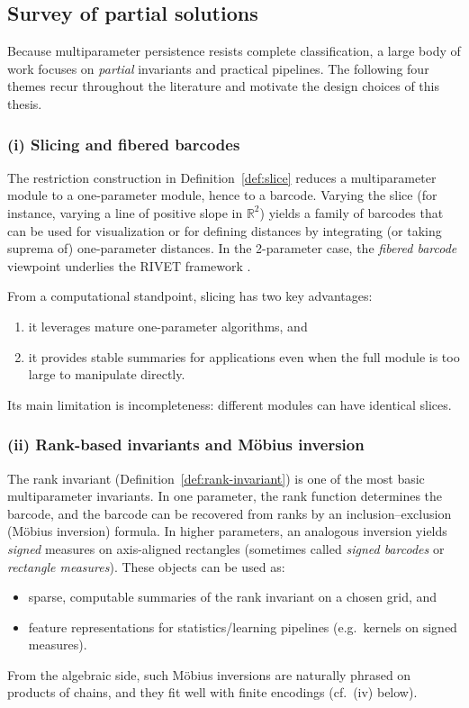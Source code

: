 \documentclass{article}
\newcommand{\<}{\langle}
\renewcommand{\>}{\rangle}
\newcommand{\bbb}[1]{\ensuremath{\mathbb{#1}}}
\theoremstyle{definition}
\theoremstyle{remark}
\begin{document}
	\subsection{Survey of partial solutions}
	\label{sec:background:partial-solutions}
	
	Because multiparameter persistence resists complete classification, a large body of
	work focuses on \emph{partial} invariants and practical pipelines.  The following
	four themes recur throughout the literature and motivate the design choices of this
	thesis.
	
	\subsubsection*{(i) Slicing and fibered barcodes}
	
	The restriction construction in Definition~\ref{def:slice} reduces a multiparameter
	module to a one-parameter module, hence to a barcode.  Varying the slice (for
	instance, varying a line of positive slope in $\bbb{R}^2$) yields a family of barcodes
	that can be used for visualization or for defining distances by integrating (or
	taking suprema of) one-parameter distances.  In the 2-parameter case, the
	\emph{fibered barcode} viewpoint underlies the RIVET framework \cite{RIVET}.
	
	From a computational standpoint, slicing has two key advantages:
	\begin{enumerate}[label=(\roman*)]
		\item it leverages mature one-parameter algorithms, and
		\item it provides stable summaries for applications even when the full module is too
		large to manipulate directly.
	\end{enumerate}
	Its main limitation is incompleteness: different modules can have identical slices.
	
	\subsubsection*{(ii) Rank-based invariants and M\"obius inversion}
	
	The rank invariant (Definition~\ref{def:rank-invariant}) is one of the most basic
	multiparameter invariants.  In one parameter, the rank function determines the
	barcode, and the barcode can be recovered from ranks by an inclusion--exclusion
	(M\"obius inversion) formula.  In higher parameters, an analogous inversion yields
	\emph{signed} measures on axis-aligned rectangles (sometimes called \emph{signed
		barcodes} or \emph{rectangle measures}).  These objects can be used as:
	\begin{itemize}
		\item sparse, computable summaries of the rank invariant on a chosen grid, and
		\item feature representations for statistics/learning pipelines (e.g.\ kernels on
		signed measures).
	\end{itemize}
	From the algebraic side, such M\"obius inversions are naturally phrased on products of
	chains, and they fit well with finite encodings (cf.\ (iv) below).
	
\end{document}
